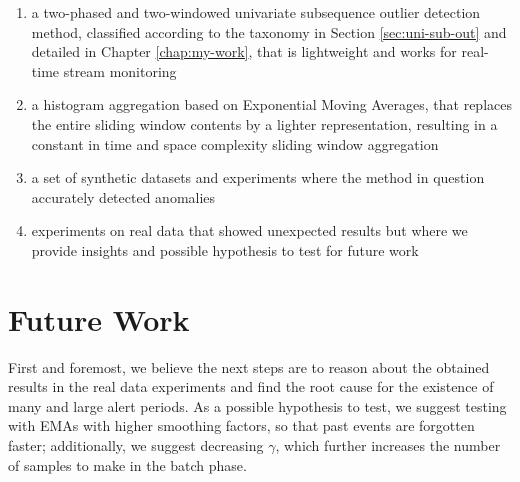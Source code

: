 \begin{enumerate}
    \item a two-phased and two-windowed univariate subsequence outlier detection method, classified according to the taxonomy in Section \ref{sec:uni-sub-out} and detailed in Chapter \ref{chap:my-work}, that is lightweight and works for real-time stream monitoring
    
    \item a histogram aggregation based on Exponential Moving Averages, that replaces the entire sliding window contents by a lighter representation, resulting in a constant in time and space complexity sliding window aggregation
    
    \item a set of synthetic datasets and experiments where the method in question accurately detected anomalies
    
    \item experiments on real data that showed unexpected results but where we provide insights and possible hypothesis to test for future work
\end{enumerate}

\section{Future Work}

First and foremost, we believe the next steps are to reason about the obtained results in the real data experiments and find the root cause for the existence of many and large alert periods. As a possible hypothesis to test, we suggest testing with EMAs with higher smoothing factors, so that past events are forgotten faster; additionally, we suggest decreasing $\gamma$, which further increases the number of samples to make in the batch phase.

